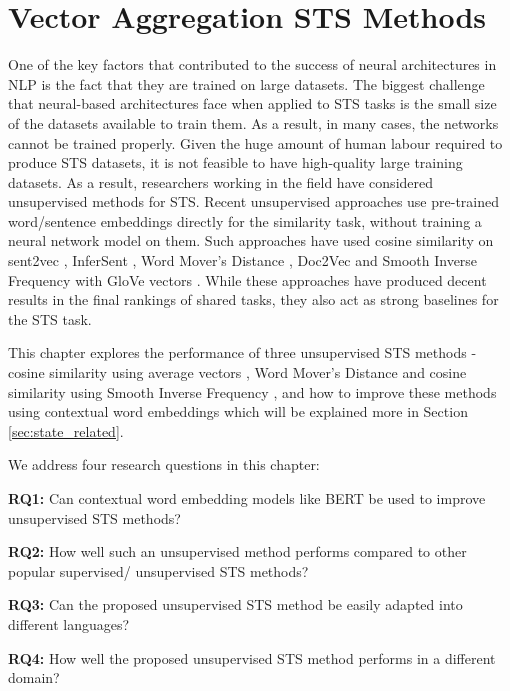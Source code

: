 \chapter{\label{cha:sts_state_of_the_art_methods}Vector Aggregation STS Methods}

One of the key factors that contributed to the success of neural architectures in NLP is the fact that they are trained on large datasets. The biggest challenge that neural-based architectures face when applied to STS tasks is the small size of the datasets available to train them. As a result, in many cases, the networks cannot be trained properly. Given the huge amount of human labour required to produce STS datasets, it is not feasible to have high-quality large training datasets. As a result, researchers working in the field have considered unsupervised methods for STS. Recent unsupervised approaches use pre-trained word/sentence embeddings directly for the similarity task, without training a neural network model on them. Such approaches have used cosine similarity on sent2vec \autocite{pagliardini-etal-2018-unsupervised}, InferSent \autocite{conneau-EtAl:2017:EMNLP2017}, Word Mover's Distance \autocite{pmlr-v32-le14}, Doc2Vec \autocite{pmlr-v32-le14} and Smooth Inverse Frequency with GloVe vectors \autocite{DBLP:conf/iclr/AroraLM17}. While these approaches have produced decent results in the final rankings of shared tasks, they also act as strong baselines for the STS task. 

This chapter explores the performance of three unsupervised STS methods - cosine similarity using average vectors \autocite{mitchell-lapata-2008-vector}, Word Mover's Distance \autocite{10.5555/3045118.3045221} and cosine similarity using Smooth Inverse Frequency \autocite{DBLP:conf/iclr/AroraLM17}, and how to improve these methods using contextual word embeddings which will be explained more in Section \ref{sec:state_related}. 

We address four research questions in this chapter:

\textbf{RQ1:} Can contextual word embedding models like BERT be used to improve unsupervised STS methods?

\textbf{RQ2:} How well such an unsupervised method performs compared to other popular supervised/ unsupervised STS methods?

\textbf{RQ3:} Can the proposed unsupervised STS method be easily adapted into different languages?

\textbf{RQ4:} How well the proposed unsupervised STS method performs in a different domain? 


